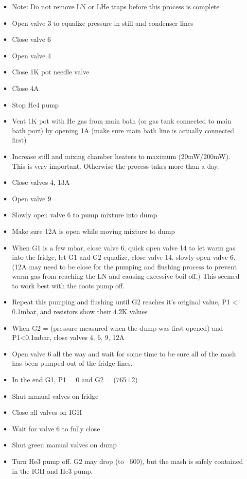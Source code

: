 \begin{itemize}
\item Note: Do not remove LN or LHe traps before this process is complete
\item Open valve 3 to equalize pressure in still and condenser lines
\item Close valve 6
\item Open valve 4
\item Close 1K pot needle valve
\item Close 4A
\item Stop He4 pump
\item Vent 1K pot with He gas from main bath (or gas tank connected to main bath port) by opening 1A (make sure main bath line is actually connected first)
\item Increase still and mixing chamber heaters to maximum (20mW/200mW). This is very important. Otherwise the process takes more than a day.
\item Close valves 4, 13A
\item Open valve 9
\item Slowly open valve 6 to pump mixture into dump
\item Make sure 12A is open while moving mixture to dump
\item When G1 is a few mbar, close valve 6, quick open valve 14 to let warm gas into the fridge, let G1 and G2 equalize, close valve 14, slowly open valve 6. (12A may need to be close for the pumping and flushing process to prevent warm gas from reaching the LN and causing excessive boil off.) This seemed to work best with the roots pump off.
\item Repeat this pumping and flushing until G2 reaches it’s original value, P1 < 0.1mbar, and resistors show their 4.2K values
\item When G2 = (pressure measured when the dump was first opened) and P1<0.1mbar, close valves 4, 6, 9, 12A
\item Open valve 6 all the way and wait for some time to be sure all of the mash has been pumped out of the fridge lines.
\item In the end G1, P1 = 0 and G2 = (765±2)
\item Shut manual valves on fridge
\item Close all valves on IGH
\item Wait for valve 6 to fully close
\item Shut green manual valves on dump
\item Turn He3 pump off. G2 may drop (to ~600), but the mash is safely contained in the IGH and He3 pump.
\end{itemize}

